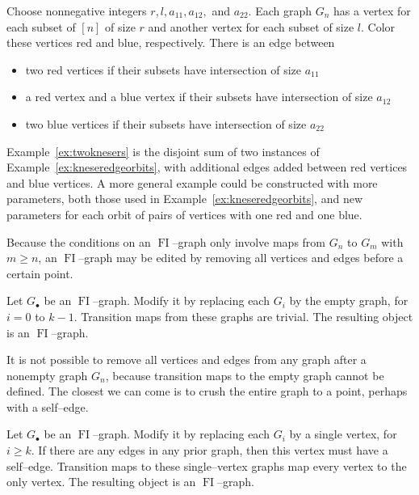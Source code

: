 \documentclass[ALCO,ThmDefs,Unicode,epreuves]{cedram}
\DeclareMathOperator{\FI}{FI}
\newcommand{\dt}{\bullet}
\begin{document}
\begin{example}\label{ex:twoknesers}
Choose nonnegative integers $r, l, a_{11}, a_{12},$ and $a_{22}$. Each graph $G_n$ has a vertex for each subset of $[n]$ of size $r$ and another vertex for each subset of size $l$. Color these vertices red and blue, respectively. There is an edge between
\begin{itemize}
\item two red vertices if their subsets have intersection of size $a_{11}$
\item a red vertex and a blue vertex if their subsets have intersection of size $a_{12}$
\item two blue vertices if their subsets have intersection of size $a_{22}$
\end{itemize} 
\end{example}

Example~\ref{ex:twoknesers} is the disjoint sum of two instances of Example~\ref{ex:kneseredgeorbits}, with additional edges added between red vertices and blue vertices. A more general example could be constructed with more parameters, both those used in Example~\ref{ex:kneseredgeorbits}, and new parameters for each orbit of pairs of vertices with one red and one blue.

Because the conditions on an $\FI$--graph only involve maps from $G_n$ to $G_m$ with $m \geq n$, an $\FI$--graph may be edited by removing all vertices and edges before a certain point. 

\begin{example}\label{ex:zeromod}
Let $G_\dt$ be an $\FI$--graph. Modify it by replacing each $G_i$ by the empty graph, for $i = 0$ to $k-1$. Transition maps from these graphs are trivial. The resulting object is an $\FI$--graph.
\end{example}

It is not possible to remove all vertices and edges from any graph after a nonempty graph $G_n$, because transition maps to the empty graph cannot be defined. The closest we can come is to crush the entire graph to a point, perhaps with a self--edge. 

\begin{example}\label{ex:onemod}
Let $G_\dt$ be an $\FI$--graph. Modify it by replacing each $G_i$ by a single vertex, for $i \geq k$. If there are any edges in any prior graph, then this vertex must have a self--edge. Transition maps to these single--vertex graphs map every vertex to the only vertex. The resulting object is an $\FI$--graph.
\end{example}
\end{document}
